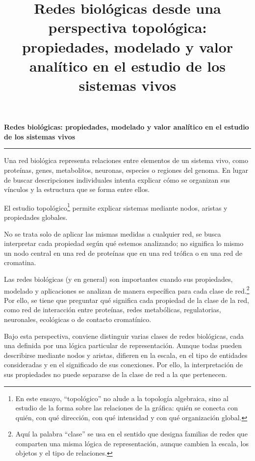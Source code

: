 \documentclass[11pt]{article}
\title{\textbf{Redes biológicas desde una perspectiva topológica: \\propiedades, modelado y valor analítico en el estudio de los sistemas vivos}}
\author{}
\date{}
\newcommand{\essaydisplayfont}{\rmfamily}
\newcommand{\essaytitle}{Redes biol\'ogicas: propiedades, modelado y valor anal\'itico en el estudio de los sistemas vivos}
\newcommand{\essaytitleblock}{%
  \begin{center}
    {\essaydisplayfont\fontsize{18}{22}\selectfont\bfseries \essaytitle\par}
    \vspace{0.55em}
    {\color{essayrule}\rule{0.32\linewidth}{0.6pt}\par}
  \end{center}
}
\begin{document}
\essaytitleblock


Una red biológica representa relaciones entre elementos de un sistema vivo, como proteínas, genes, metabolitos, neuronas, especies o regiones del genoma. En lugar de buscar descripciones individuales intenta explicar cómo se organizan sus vínculos y la estructura que se forma entre ellos. 

El estudio topológico\footnote{En este ensayo, \enquote{topológico} no alude a la topología algebraica, sino al estudio de la forma sobre las relaciones de la gráfica: quién se conecta con quién, con qué dirección, con qué intensidad y con qué organización global.} permite explicar sistemas mediante nodos, aristas y propiedades globales. 

No se trata solo de aplicar las mismas medidas a cualquier red, se busca interpretar cada propiedad según qué estemos analizando; no significa lo mismo un nodo central en una red de proteínas que en una red trófica o en una red de cromatina.

Las redes biológicas (y en general) son importantes cuando sus propiedades, modelado y aplicaciones se analizan de manera específica para cada clase de red.\footnote{Aquí la palabra \enquote{clase} se usa en el sentido que designa familias de redes que comparten una misma lógica de representación, aunque cambien la escala, los objetos y el tipo de relaciones.} Por ello, se tiene que preguntar qué significa cada propiedad de la clase de la red, como red de interacción entre proteínas, redes metabólicas, regulatorias, neuronales, ecológicas o de contacto cromatínico.



Bajo esta perspectiva, conviene distinguir varias clases de redes biológicas, cada una definida por una lógica particular de representación. Aunque todas pueden describirse mediante nodos y aristas, difieren en la escala, en el tipo de entidades consideradas y en el significado de sus conexiones. Por ello, la interpretación de sus propiedades no puede separarse de la clase de red a la que pertenecen.
\end{document}
